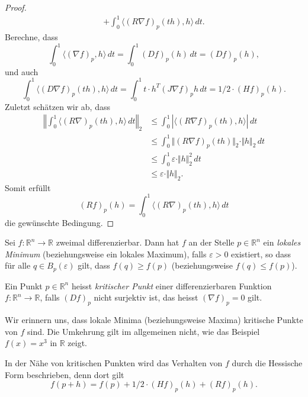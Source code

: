 \documentclass[../main.tex]{subfiles}
\begin{document}
\begin{proof}
\begin{align*}
    + \int_{0}^{1} \langle {(R \nabla f)}_p (th), h \rangle \, dt.
  \end{align*}
  Berechne, dass
  \[
    \int_{0}^{1} \langle {(\nabla f)}_p , h \rangle \, dt
    = \int_{0}^{1} {(Df)}_p(h) \, dt = {(Df)}_p (h),
  \]
  und auch
  \[
     \int_{0}^{1} \langle {(D \nabla f)}_p (th), h \rangle \, dt
     = \int_{0}^{1} t \cdot h^T {(J \nabla f)}_p h \, dt
     = 1/2 \cdot {(Hf)}_p(h).
  \]
  Zuletzt schätzen wir ab, dass
  \begin{align*}
    \left\Vert \int_{0}^{1} \langle {(R \nabla )}_p (th), h \rangle \, dt \right\Vert_2
    &\leq \int_{0}^{1} | \langle {(R \nabla f)}_p (th), h \rangle | \, dt  \\
    &\leq \int_{0}^{1} \Vert {(R \nabla f)}_p (th) \Vert_2
    \cdot \Vert h \Vert_2 \, dt \\
    &\leq \int_{0}^{1} \varepsilon \cdot \Vert h \Vert_2^2 \, dt \\
    &\leq \varepsilon \cdot \Vert h \Vert_2.
  \end{align*}
  Somit erfüllt
  \[
    {(Rf)}_p(h) = \int_{0}^{1} \langle {(R \nabla )}_p (th), h \rangle \, dt
  \]
  die gewünschte Bedingung.
\end{proof}

Sei $f \colon \mathbb{R}^n \to \mathbb{R}$ zweimal differenzierbar.
Dann hat $f$ an der Stelle $p \in \mathbb{R}^n$
ein \emph{lokales Minimum} (beziehungsweise ein lokales Maximum),
falls $\varepsilon > 0$ existiert, so dass für
alle $q \in B_p( \varepsilon)$ gilt, dass
$f(q) \geq f(p)$ (beziehungsweise $f(q) \leq f(p)$).

\begin{definition}
  Ein Punkt $p \in \mathbb{R}^n$ heisst \emph{kritischer Punkt}
  einer differenzierbaren Funktion $f \colon \mathbb{R}^n \to \mathbb{R}$,
  falls
  ${(Df)}_p$ nicht surjektiv ist, das heisst
  ${(\nabla f)}_p = 0$ gilt.
\end{definition}

\begin{remark}
  Wir erinnern uns, dass lokale Minima (beziehungsweise Maxima)
  kritische Punkte von $f$ sind. Die Umkehrung gilt im
  allgemeinen nicht, wie das Beispiel
  $f(x) = x^3$ in $\mathbb{R}$ zeigt.
\end{remark}

In der Nähe von kritischen Punkten wird
das Verhalten von $f$ durch die Hessische
Form beschrieben, denn dort gilt
\[
  f(p + h) = f(p) + 1/2 \cdot {(Hf)}_p(h) + {(Rf)}_p(h).
\]
\end{document}
